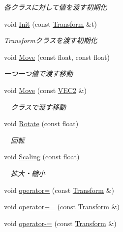 \begin{DoxyCompactItemize}
\begin{DoxyCompactList}\small\item\em 各クラスに対して値を渡す初期化 \end{DoxyCompactList}\item 
void \mbox{\hyperlink{class_transform_a2d0cb73aca3f73de81f2bf8463cdb942}{Init}} (const \mbox{\hyperlink{class_transform}{Transform}} \&t)
\begin{DoxyCompactList}\small\item\em Transformクラスを渡す初期化 \end{DoxyCompactList}\item 
void \mbox{\hyperlink{class_transform_a45772ecb47b60d5b3f110613c3f15984}{Move}} (const float, const float)
\begin{DoxyCompactList}\small\item\em 一つ一つ値で渡す移動 \end{DoxyCompactList}\item 
void \mbox{\hyperlink{class_transform_a13dbb800ca989856d1f56c03dd9a0ad0}{Move}} (const \mbox{\hyperlink{transform_8h_afb0c5e21d4133ff4f200992c0b534e1b}{V\+E\+C2}} \&)
\begin{DoxyCompactList}\small\item\em 　クラスで渡す移動 \end{DoxyCompactList}\item 
void \mbox{\hyperlink{class_transform_a696d7e837eafa09409150fb055daa223}{Rotate}} (const float)
\begin{DoxyCompactList}\small\item\em 　回転 \end{DoxyCompactList}\item 
void \mbox{\hyperlink{class_transform_ad6097ddf1d30f5a1023725efbee375fb}{Scaling}} (const float)
\begin{DoxyCompactList}\small\item\em 　拡大・縮小 \end{DoxyCompactList}\item 
void \mbox{\hyperlink{class_transform_af1a25489903986022218a798e4f40251}{operator=}} (const \mbox{\hyperlink{class_transform}{Transform}} \&)
\item 
void \mbox{\hyperlink{class_transform_a3b0aa54a1ca373ec3a7052977b5bf826}{operator+=}} (const \mbox{\hyperlink{class_transform}{Transform}} \&)
\item 
void \mbox{\hyperlink{class_transform_a204ee3471c1d08188076e3645c9f3517}{operator-\/=}} (const \mbox{\hyperlink{class_transform}{Transform}} \&)

\end{DoxyCompactItemize}
